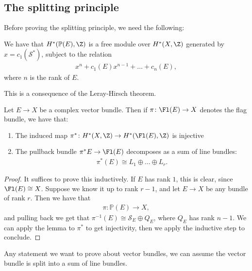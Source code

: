 \documentclass[11pt]{book}
\begin{document}
\subsection{The splitting principle}

Before proving the splitting principle, we need the following:

\begin{lemma} We have that $H^\ast(\mathbb{P}(E),\Z)$ is a free module over $H^\ast(X,\Z)$ generated by $x = c_1(\mathcal{S}^\ast)$, subject to the relation
\begin{align*}
    x^n + c_1(E)x^{n-1} + \ldots + c_n(E),
\end{align*}
where $n$ is the rank of $E$.
\end{lemma}
This is a consequence of the Leray-Hirsch theorem.

\begin{theorem} Let $E \to X$ be a complex vector bundle. Then if $\pi \colon \Fl(E) \to X$ denotes the flag bundle, we have that:
\begin{enumerate}
    \item The induced map $\pi^\ast \colon H^\ast(X,\Z) \to H^\ast(\Fl(E),\Z)$ is injective
    \item The pullback bundle $\pi^\ast E \to \Fl(E)$ decomposes as a sum of line bundles:
    \begin{align*}
        \pi^\ast(E) \cong L_1 \oplus \ldots \oplus L_r.
    \end{align*}
\end{enumerate}
\end{theorem}
\begin{proof} It suffices to prove this inductively. If $E$ has rank $1$, this is clear, since $\Fl(E) \cong X$. Suppose we know it up to rank $r-1$, and let $E \to X$ be any bundle of rank $r$. Then we have that
\begin{align*}
    \pi \colon \mathbb{P}(E) \to X,
\end{align*}
and pulling back we get that $\pi^{-1}(E) \cong \mathcal{S}_E \oplus Q_E$, where $Q_E$ has rank $n-1$. We can apply the lemma to $\pi^\ast$ to get injectivity, then we apply the inductive step to conclude.
\end{proof}

\begin{slogan} Any statement we want to prove about vector bundles, we can assume the vector bundle is split into a sum of line bundles.
\end{slogan}
\end{document}
